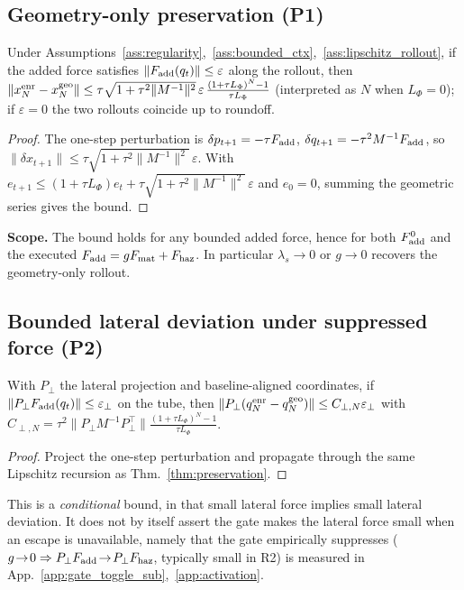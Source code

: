 \subsection{Geometry-only preservation (P1)}
\begin{theorem}\label{thm:preservation}
Under Assumptions~\ref{ass:regularity},~\ref{ass:bounded_ctx},~\ref{ass:lipschitz_rollout},
if the added force satisfies $\|F_{\rm add}(q_t)\|\le\varepsilon$ along the
rollout, then
$\|x_N^{\rm enr}-x_N^{\rm geo}\|\le\tau\sqrt{1+\tau^2\|M^{-1}\|^2}\,\varepsilon\,
\frac{(1+\tau L_\Phi)^N-1}{\tau L_\Phi}$
(interpreted as $N$ when $L_\Phi{=}0$); if $\varepsilon{=}0$ the two rollouts
coincide up to roundoff.
\end{theorem}
\begin{proof}
The one-step perturbation is $\delta p_{t+1}=-\tau F_{\rm add}$,
$\delta q_{t+1}=-\tau^2 M^{-1}F_{\rm add}$, so
$\|\delta x_{t+1}\|\le\tau\sqrt{1+\tau^2\|M^{-1}\|^2}\,\varepsilon$. With
$e_{t+1}\le(1+\tau L_\Phi)e_t+\tau\sqrt{1+\tau^2\|M^{-1}\|^2}\,\varepsilon$ and
$e_0{=}0$, summing the geometric series gives the bound.
\end{proof}
\noindent\textbf{Scope.} The bound holds for any bounded added force, hence for
both $F_{\rm add}^0$ and the executed $F_{\rm add}=g F_{\rm mat}+F_{\rm haz}$. In
particular $\lambda_s\!\to\!0$ or $g\!\to\!0$ recovers the geometry-only rollout.

\subsection{Bounded lateral deviation under suppressed force (P2)}
\begin{corollary}\label{cor:bounded_lateral}
With $P_\perp$ the lateral projection and baseline-aligned coordinates, if
$\|P_\perp F_{\rm add}(q_t)\|\le\varepsilon_\perp$ on the tube, then
$\|P_\perp(q_N^{\rm enr}-q_N^{\rm geo})\|\le C_{\perp,N}\varepsilon_\perp$ with
$C_{\perp,N}=\tau^2\|P_\perp M^{-1}P_\perp^\top\|\frac{(1+\tau L_\Phi)^N-1}{\tau L_\Phi}$.
\end{corollary}
\begin{proof}
Project the one-step perturbation and propagate through the same Lipschitz
recursion as Thm.~\ref{thm:preservation}.
\end{proof}
This is a \emph{conditional} bound, in that small lateral force implies small lateral deviation.
It does not by itself assert the gate makes the lateral force small when an
escape is unavailable, namely that the gate empirically suppresses
($g\!\to\!0\Rightarrow P_\perp F_{\rm add}\!\to\!P_\perp F_{\rm haz}$, typically
small in R2) is measured in App.~\ref{app:gate_toggle_sub},~\ref{app:activation}.

